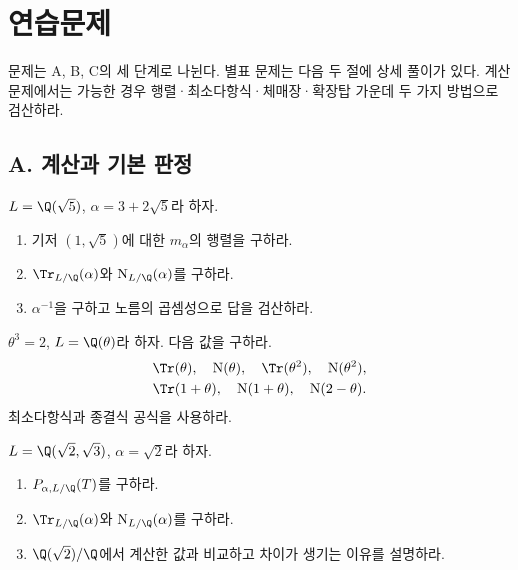 \clearpage
\section{연습문제}
\label{sec:norm-trace-exercises}

문제는 A, B, C의 세 단계로 나뉜다. 별표 문제는 다음 두 절에 상세 풀이가 있다. 계산 문제에서는 가능한 경우 행렬·최소다항식·체매장·확장탑 가운데 두 가지 방법으로 검산하라.

\subsection*{A. 계산과 기본 판정}

\begin{exercise}[*]
\label{ex:norm-trace-quadratic-matrix}
$L=\Q(\sqrt5)$, $\alpha=3+2\sqrt5$라 하자.
\begin{enumerate}[label=(\alph*)]
  \item 기저 $(1,\sqrt5)$에 대한 $m_\alpha$의 행렬을 구하라.
  \item $\Tr_{L/\Q}(\alpha)$와 $\operatorname N_{L/\Q}(\alpha)$를 구하라.
  \item $\alpha^{-1}$을 구하고 노름의 곱셈성으로 답을 검산하라.
\end{enumerate}
\end{exercise}

\begin{exercise}[*]
\label{ex:norm-trace-pure-cubic}
$\theta^3=2$, $L=\Q(\theta)$라 하자. 다음 값을 구하라.
\[
\begin{gathered}
  \Tr(\theta),\quad \operatorname N(\theta),\quad
  \Tr(\theta^2),\quad \operatorname N(\theta^2),\\
  \Tr(1+\theta),\quad \operatorname N(1+\theta),\quad
  \operatorname N(2-\theta).
\end{gathered}
\]
최소다항식과 종결식 공식을 사용하라.
\end{exercise}

\begin{exercise}[*]
\label{ex:characteristic-polynomial-repeated}
$L=\Q(\sqrt2,\sqrt3)$, $\alpha=\sqrt2$라 하자.
\begin{enumerate}[label=(\alph*)]
  \item $P_{\alpha,L/\Q}(T)$를 구하라.
  \item $\Tr_{L/\Q}(\alpha)$와 $\operatorname N_{L/\Q}(\alpha)$를 구하라.
  \item $\Q(\sqrt2)/\Q$에서 계산한 값과 비교하고 차이가 생기는 이유를 설명하라.
\end{enumerate}
\end{exercise}


